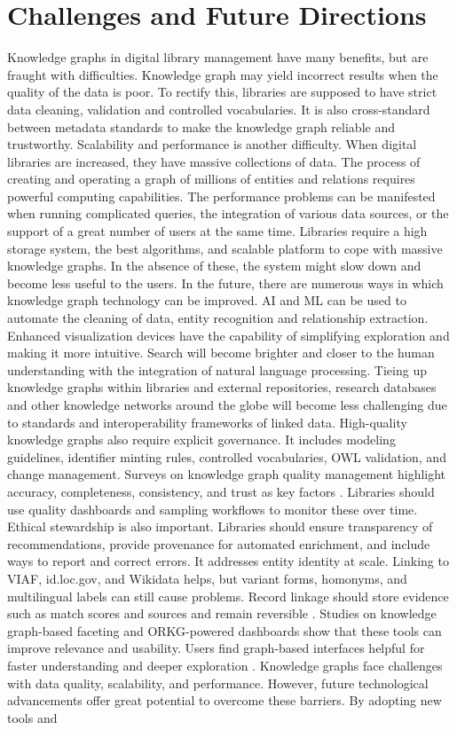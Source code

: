 \documentclass[12pt,a4paper]{article}
\begin{document}
\section{Challenges and Future Directions}
Knowledge graphs in digital library management have many benefits, but are fraught with difficulties. Knowledge graph may yield incorrect results when the quality of the data is poor. To rectify this, libraries are supposed to have strict data cleaning, validation and controlled vocabularies. It is also cross-standard between metadata standards to make the knowledge graph reliable and trustworthy. Scalability and performance is another difficulty. When digital libraries are increased, they have massive collections of data. The process of creating and operating a graph of millions of entities and relations requires powerful computing capabilities. The performance problems can be manifested when running complicated queries, the integration of various data sources, or the support of a great number of users at the same time. Libraries require a high storage system, the best algorithms, and scalable platform to cope with massive knowledge graphs. In the absence of these, the system might slow down and become less useful to the users. In the future, there are numerous ways in which knowledge graph technology can be improved. AI and ML can be used to automate the cleaning of data, entity recognition and relationship extraction. Enhanced visualization devices have the capability of simplifying exploration and making it more intuitive. Search will become brighter and closer to the human understanding with the integration of natural language processing. Tieing up knowledge graphs within libraries and external repositories, research databases and other knowledge networks around the globe will become less challenging due to standards and interoperability frameworks of linked data. High-quality knowledge graphs also require explicit governance. It includes modeling guidelines, identifier minting rules, controlled vocabularies, OWL validation, and change management. Surveys on knowledge graph quality management highlight accuracy, completeness, consistency, and trust as key factors \cite{xue2022quality}. Libraries should use quality dashboards and sampling workflows to monitor these over time. Ethical stewardship is also important. Libraries should ensure transparency of recommendations, provide provenance for automated enrichment, and include ways to report and correct errors. It addresses entity identity at scale. Linking to VIAF, id.loc.gov, and Wikidata helps, but variant forms, homonyms, and multilingual labels can still cause problems. Record linkage should store evidence such as match scores and sources and remain reversible \cite{rdf11}. Studies on knowledge graph-based faceting and ORKG-powered dashboards show that these tools can improve relevance and usability. Users find graph-based interfaces helpful for faster understanding and deeper exploration \cite{lezhnina2022dashboard}. Knowledge graphs face challenges with data quality, scalability, and performance. However, future technological advancements offer great potential to overcome these barriers. By adopting new tools and 
\end{document}
